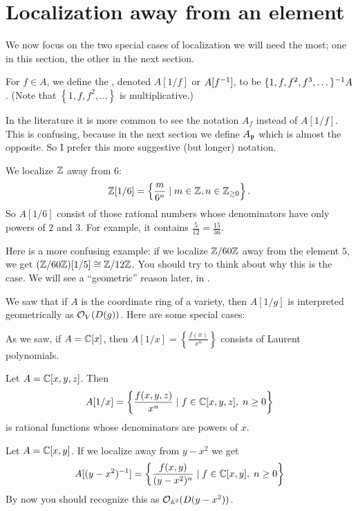 \section{Localization away from an element}
We now focus on the two special cases of localization we will need the most;
one in this section, the other in the next section.
\begin{definition}
	For $f \in A$, we define the ,
	denoted $A[1/f]$ or $A[f^{-1}]$,
	to be $\{1, f, f^2, f^3, \dots\}^{-1} A$.
	(Note that $\left\{ 1, f, f^2, \dots \right\}$ is multiplicative.)
\end{definition}
\begin{remark}
	In the literature it is more common to
	see the notation $A_f$ instead of $A[1/f]$.
	This is confusing, because in the next section
	we define $A_\mathfrak p$ which is almost the opposite.
	So I prefer this more suggestive (but longer) notation.
\end{remark}

\begin{example}
	\listhack
	\begin{enumerate}[(a)]
		\ii We localize $\mathbb Z$ away from $6$:
		\[ \mathbb Z[1/6] = \left\{ \frac{m}{6^n} \mid m \in \mathbb Z,
			n \in \mathbb Z_{\ge 0} \right\}.  \]
		So $A[1/6]$ consist of those rational numbers whose
		denominators have only powers of $2$ and $3$.
		For example, it contains $\frac{5}{12} = \frac{15}{36}$.

		\ii Here is a more confusing example:
		if we localize $\mathbb Z/60\mathbb Z$ away from the element $5$,
		we get $(\mathbb Z/60\mathbb Z)[1/5] \cong \mathbb Z/12\mathbb Z$.
		You should try to think about why this is the case.
		We will see a ``geometric'' reason later,
		in .
	\end{enumerate}
\end{example}


\begin{example}
	We saw that if $A$ is the coordinate ring of a variety,
	then $A[1/g]$ is interpreted geometrically as $\mathcal O_V(D(g))$.
	Here are some special cases:
	\begin{enumerate}[(a)]
		\ii As we saw, if $A = \mathbb C[x]$,
		then $A[1/x] = \left\{ \frac{f(x)}{x^n} \right\}$
		consists of Laurent polynomials.

		\ii Let $A = \mathbb C[x,y,z]$.
		Then \[ A[1/x] = \left\{ \frac{f(x,y,z)}{x^n} \mid
			f \in \mathbb C[x,y,z], \; n \ge 0 \right\} \]
		is rational functions whose denominators are powers of $x$.

		\ii Let $A = \mathbb C[x,y]$.
		If we localize away from $y-x^2$ we get
		\[ A[(y-x^2)^{-1}] = \left\{ \frac{f(x,y)}{(y-x^2)^n} \mid
			f \in \mathbb C[x,y], \; n \ge 0 \right\} \]
		By now you should recognize this as $\mathcal O_{\mathbb A^2}(D(y-x^2))$.
	\end{enumerate}
\end{example}

